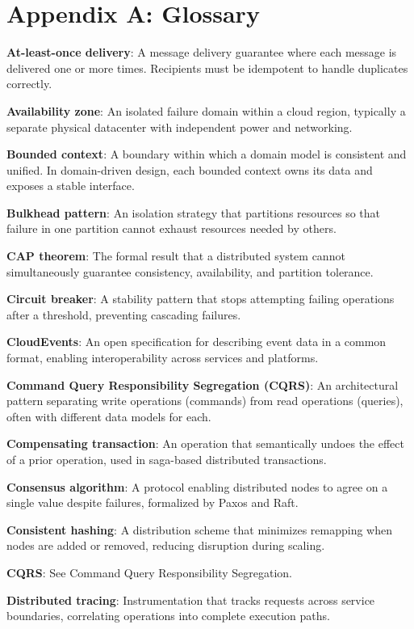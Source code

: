\section{Appendix A: Glossary}

\textbf{At-least-once delivery}: A message delivery guarantee where each message is delivered one or more times. Recipients must be idempotent to handle duplicates correctly.

\textbf{Availability zone}: An isolated failure domain within a cloud region, typically a separate physical datacenter with independent power and networking.

\textbf{Bounded context}: A boundary within which a domain model is consistent and unified. In domain-driven design, each bounded context owns its data and exposes a stable interface.

\textbf{Bulkhead pattern}: An isolation strategy that partitions resources so that failure in one partition cannot exhaust resources needed by others.

\textbf{CAP theorem}: The formal result that a distributed system cannot simultaneously guarantee consistency, availability, and partition tolerance.

\textbf{Circuit breaker}: A stability pattern that stops attempting failing operations after a threshold, preventing cascading failures.

\textbf{CloudEvents}: An open specification for describing event data in a common format, enabling interoperability across services and platforms.

\textbf{Command Query Responsibility Segregation (CQRS)}: An architectural pattern separating write operations (commands) from read operations (queries), often with different data models for each.

\textbf{Compensating transaction}: An operation that semantically undoes the effect of a prior operation, used in saga-based distributed transactions.

\textbf{Consensus algorithm}: A protocol enabling distributed nodes to agree on a single value despite failures, formalized by Paxos and Raft.

\textbf{Consistent hashing}: A distribution scheme that minimizes remapping when nodes are added or removed, reducing disruption during scaling.

\textbf{CQRS}: See Command Query Responsibility Segregation.

\textbf{Distributed tracing}: Instrumentation that tracks requests across service boundaries, correlating operations into complete execution paths.

